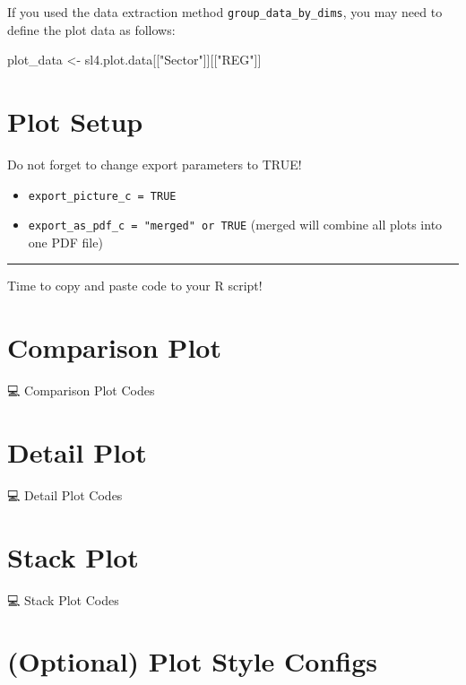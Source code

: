\documentclass[
]{article}
\newenvironment{Shaded}{\begin{snugshade}}{\end{snugshade}}
\newcommand{\NormalTok}[1]{#1}
\newcommand{\OtherTok}[1]{\textcolor[rgb]{0.56,0.35,0.01}{#1}}
\newcommand{\StringTok}[1]{\textcolor[rgb]{0.31,0.60,0.02}{#1}}
\begin{document}
If you used the data extraction method \texttt{group\_data\_by\_dims},
you may need to define the plot data as follows:

\begin{Shaded}
\begin{Highlighting}[]
\NormalTok{plot\_data }\OtherTok{\textless{}{-}}\NormalTok{ sl4.plot.data[[}\StringTok{"Sector"}\NormalTok{]][[}\StringTok{"REG"}\NormalTok{]]}
\end{Highlighting}
\end{Shaded}

\section*{Plot Setup}\label{plot-setup}

Do not forget to change export parameters to TRUE!

\begin{itemize}
\item
  \texttt{export\_picture\_c\ =\ TRUE}
\item
  \texttt{export\_as\_pdf\_c\ =\ "merged"\ or\ TRUE} (merged will
  combine all plots into one PDF file)
\end{itemize}

\begin{center}\rule{0.5\linewidth}{0.5pt}\end{center}

Time to copy and paste code to your R script!

\section{Comparison Plot}\label{comparison-plot}

💻 Comparison Plot Codes

\section{Detail Plot}\label{detail-plot}

💻 Detail Plot Codes

\section{Stack Plot}\label{stack-plot}

💻 Stack Plot Codes

\section*{(Optional) Plot Style
Configs}\label{optional-plot-style-configs}
\end{document}
